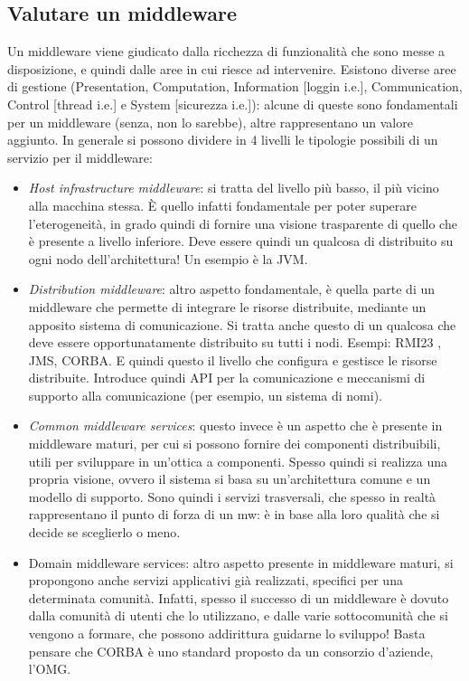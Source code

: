 \subsection{Valutare un middleware}
Un middleware viene giudicato dalla ricchezza di funzionalità che sono messe a disposizione, e quindi dalle aree in 
cui riesce ad intervenire. Esistono diverse aree di gestione (Presentation, Computation, Information [loggin i.e.],
Communication, Control [thread i.e.] e System [sicurezza i.e.]): alcune di queste sono fondamentali per un middleware
(senza, non lo sarebbe), altre rappresentano un valore aggiunto.
In generale si possono dividere in 4 livelli le tipologie possibili di un servizio per il middleware:
\begin{itemize}
 \item \textit{Host infrastructure middleware}: si tratta del livello più basso, il più vicino alla macchina stessa. 
 È quello infatti fondamentale per poter superare l'eterogeneità, in grado quindi di fornire una visione trasparente 
 di quello che è presente a livello inferiore. Deve essere quindi un qualcosa di distribuito su ogni nodo
 dell'architettura! Un esempio è la JVM.
 \item \textit{Distribution middleware}: altro aspetto fondamentale, è quella parte di un middleware che permette di
 integrare le risorse distribuite, mediante un apposito sistema di comunicazione. Si tratta anche questo di un 
 qualcosa che deve essere opportunatamente distribuito su tutti i nodi. Esempi: RMI23 , JMS, CORBA. E quindi questo
 il livello che configura e gestisce le risorse distribuite. Introduce quindi API per la comunicazione e meccanismi
 di supporto alla comunicazione (per esempio, un sistema di nomi).
 \item \textit{Common middleware services}: questo invece è un aspetto che è presente in middleware maturi, per cui si
 possono fornire dei componenti distribuibili, utili per sviluppare in un'ottica a componenti. Spesso quindi si realizza
 una propria visione, ovvero il sistema si basa su un'architettura comune e un modello di supporto. Sono quindi i
 servizi trasversali, che spesso in realtà rappresentano il punto di forza di un mw: è in base alla loro qualità
 che si decide se sceglierlo o meno.
 \item Domain middleware services: altro aspetto presente in middleware maturi, si propongono anche servizi 
 applicativi già realizzati, specifici per una determinata comunità. Infatti, spesso il successo di un middleware è
 dovuto dalla comunità di utenti che lo utilizzano, e dalle varie sottocomunità che si vengono a formare, che possono
 addirittura guidarne lo sviluppo! Basta pensare che CORBA è uno standard proposto da un consorzio d'aziende, l'OMG.
\end{itemize}

